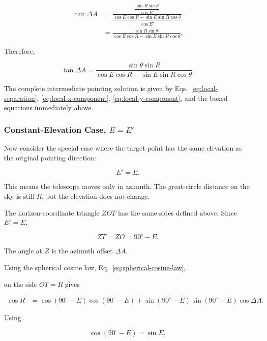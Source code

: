 \documentclass[12pt]{extarticle}
\begin{document}
\begin{align}
\tan\Delta A
&=
\frac{\dfrac{\sin R\sin\theta}{\cos E'}}
{\dfrac{\cos E\cos R - \sin E\sin R\cos\theta}{\cos E'}} \\[6pt]
&=
\frac{\sin R\sin\theta}
{\cos E\cos R - \sin E\sin R\cos\theta}.
\end{align}

Therefore,

\begin{equation} \boxed{\tan\Delta A = \frac{\sin\theta\sin R}{\cos E\cos R - \sin E\sin R\cos\theta}}. \end{equation}

The complete intermediate pointing solution is given by Eqs.~\eqref{eq:local-separation}, \eqref{eq:local-x-component}, \eqref{eq:local-y-component}, and the boxed equations immediately above.

\subsubsection{Constant-Elevation Case, \texorpdfstring{$E=E'$}{E=E'}}

Now consider the special case where the target point has the same elevation as the original pointing direction:

\begin{equation} E' = E . \end{equation}

This means the telescope moves only in azimuth. The great-circle distance on the sky is still $R$, but the elevation does not change.

The horizon-coordinate triangle $ZOT$ has the same sides defined above. Since $E'=E$,

\begin{equation} ZT = ZO = 90^\circ - E. \end{equation}

The angle at $Z$ is the azimuth offset $\Delta A$.

Using the spherical cosine law, Eq.~\eqref{eq:spherical-cosine-law},

on the side $OT=R$ gives

\begin{align}
\cos R
&=
\cos(90^\circ-E)\cos(90^\circ-E)
+
\sin(90^\circ-E)\sin(90^\circ-E)\cos\Delta A .
\end{align}

Using

\begin{equation} \cos(90^\circ-E)=\sin E, \end{equation}
\end{document}
